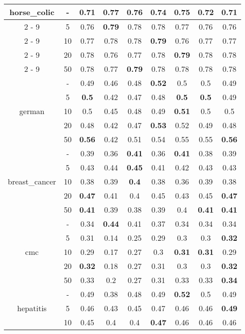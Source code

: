 \documentclass{article}%
\begin{document}
\begin{longtable}{c|c|ccccccc}
\hline%
\multirow{5}{*}{horse\_colic}&{-}&0.71&\textbf{0.77}&0.76&0.74&0.75&0.72&0.71\\%
\cline{2%
-%
9}%
&5&0.76&\textbf{0.79}&0.78&0.78&0.77&0.76&0.76\\%
\cline{2%
-%
9}%
&10&0.77&0.78&0.78&\textbf{0.79}&0.76&0.77&0.77\\%
\cline{2%
-%
9}%
&20&0.78&0.76&0.77&0.78&\textbf{0.79}&0.78&0.78\\%
\cline{2%
-%
9}%
&50&0.78&0.77&\textbf{0.79}&0.78&0.78&0.78&0.78\\%
\hline%
\multirow{5}{*}{german}&{-}&0.49&0.46&0.48&\textbf{0.52}&0.5&0.5&0.49\\%
\cline{2%
-%
9}%
&5&\textbf{0.5}&0.42&0.47&0.48&\textbf{0.5}&\textbf{0.5}&0.49\\%
\cline{2%
-%
9}%
&10&0.5&0.45&0.48&0.49&\textbf{0.51}&0.5&0.5\\%
\cline{2%
-%
9}%
&20&0.48&0.42&0.47&\textbf{0.53}&0.52&0.49&0.48\\%
\cline{2%
-%
9}%
&50&\textbf{0.56}&0.42&0.51&0.54&0.55&0.55&\textbf{0.56}\\%
\hline%
\multirow{5}{*}{breast\_cancer}&{-}&0.39&0.36&\textbf{0.41}&0.36&\textbf{0.41}&0.38&0.39\\%
\cline{2%
-%
9}%
&5&0.43&0.44&\textbf{0.45}&0.41&0.42&0.43&0.43\\%
\cline{2%
-%
9}%
&10&0.38&0.39&\textbf{0.4}&0.38&0.36&0.39&0.38\\%
\cline{2%
-%
9}%
&20&\textbf{0.47}&0.41&0.4&0.45&0.43&0.45&\textbf{0.47}\\%
\cline{2%
-%
9}%
&50&\textbf{0.41}&0.39&0.38&0.39&0.4&\textbf{0.41}&\textbf{0.41}\\%
\hline%
\multirow{5}{*}{cmc}&{-}&0.34&\textbf{0.44}&0.41&0.37&0.34&0.34&0.34\\%
\cline{2%
-%
9}%
&5&0.31&0.14&0.25&0.29&0.3&0.3&\textbf{0.32}\\%
\cline{2%
-%
9}%
&10&0.29&0.17&0.27&0.3&\textbf{0.31}&\textbf{0.31}&0.29\\%
\cline{2%
-%
9}%
&20&\textbf{0.32}&0.18&0.27&0.31&0.3&0.3&\textbf{0.32}\\%
\cline{2%
-%
9}%
&50&0.33&0.2&0.27&0.31&0.33&0.33&\textbf{0.34}\\%
\hline%
\multirow{5}{*}{hepatitis}&{-}&0.49&0.38&0.48&0.49&\textbf{0.52}&0.5&0.49\\%
\cline{2%
-%
9}%
&5&0.46&0.43&0.45&0.47&0.46&0.46&\textbf{0.49}\\%
\cline{2%
-%
9}%
&10&0.45&0.4&0.4&\textbf{0.47}&0.46&0.46&0.46\\%

\end{longtable}
\end{document}

